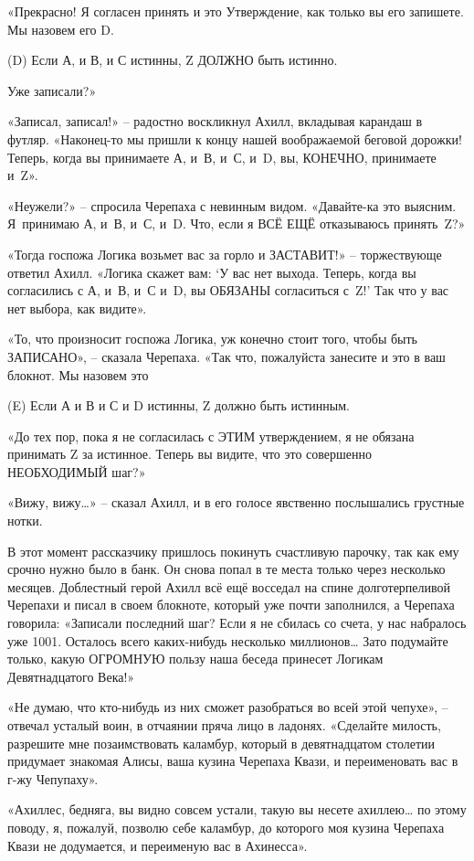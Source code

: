 \documentclass[../main.tex]{subfiles}
\begin{document}
«Прекрасно! Я согласен принять и это Утверждение, как только вы его запишете. Мы назовем его D.

\begin{statements}
    \item[(D)] Если А, и В, и С истинны, Z ДОЛЖНО быть истинно.
\end{statements}

Уже записали?»

«Записал, записал!» \--- радостно воскликнул Ахилл, вкладывая карандаш в футляр. «Наконец-то мы пришли к концу нашей воображаемой беговой дорожки! Теперь, когда вы принимаете А, и~В, и~С, и~D, вы, КОНЕЧНО, принимаете и~Z».

«Неужели?» \--- спросила Черепаха с невинным видом. «Давайте-ка это выясним. Я~принимаю А, и~В, и~С, и~D. Что, если я ВСЁ ЕЩЁ отказываюсь принять~Z?»

«Тогда госпожа Логика возьмет вас за горло и ЗАСТАВИТ!» \--- торжествующе ответил Ахилл. «Логика скажет вам: \enquote*{У вас нет выхода. Теперь, когда вы согласились с А, и~В, и~С и~D, вы ОБЯЗАНЫ согласиться с~Z!} Так что у вас нет выбора, как видите».

«То, что произносит госпожа Логика, уж конечно стоит того, чтобы быть ЗАПИСАНО», \--- сказала Черепаха. «Так что, пожалуйста занесите и это в ваш блокнот. Мы назовем это

\begin{statements}
    \item[(E)] Если А и В и С и D истинны, Z должно быть истинным.
\end{statements}

«До тех пор, пока я не согласилась с ЭТИМ утверждением, я не обязана принимать Z за истинное. Теперь вы видите, что это совершенно НЕОБХОДИМЫЙ шаг?»

«Вижу, вижу\ldots» \--- сказал Ахилл, и в его голосе явственно послышались грустные нотки.

В этот момент рассказчику пришлось покинуть счастливую парочку, так как ему срочно нужно было в банк. Он снова попал в те места только через несколько месяцев. Доблестный герой Ахилл всё ещё восседал на спине долготерпеливой Черепахи и писал в своем блокноте, который уже почти заполнился, а Черепаха говорила: «Записали последний шаг? Если я не сбилась со счета, у нас набралось уже 1001. Осталось всего каких-нибудь несколько миллионов\ldots{} Зато подумайте только, какую ОГРОМНУЮ пользу наша беседа принесет Логикам Девятнадцатого Века!»

«Не думаю, что кто-нибудь из них сможет разобраться во всей этой чепухе», \--- отвечал усталый воин, в отчаянии пряча лицо в ладонях. «Сделайте милость, разрешите мне позаимствовать каламбур, который в девятнадцатом столетии придумает знакомая Алисы, ваша кузина Черепаха Квази, и переименовать вас в г-жу Чепупаху».

«Ахиллес, бедняга, вы видно совсем устали, такую вы несете ахиллею\ldots{} по этому поводу, я, пожалуй, позволю себе каламбур, до которого моя кузина Черепаха Квази не додумается, и переименую вас в Ахинесса».
\end{document}
